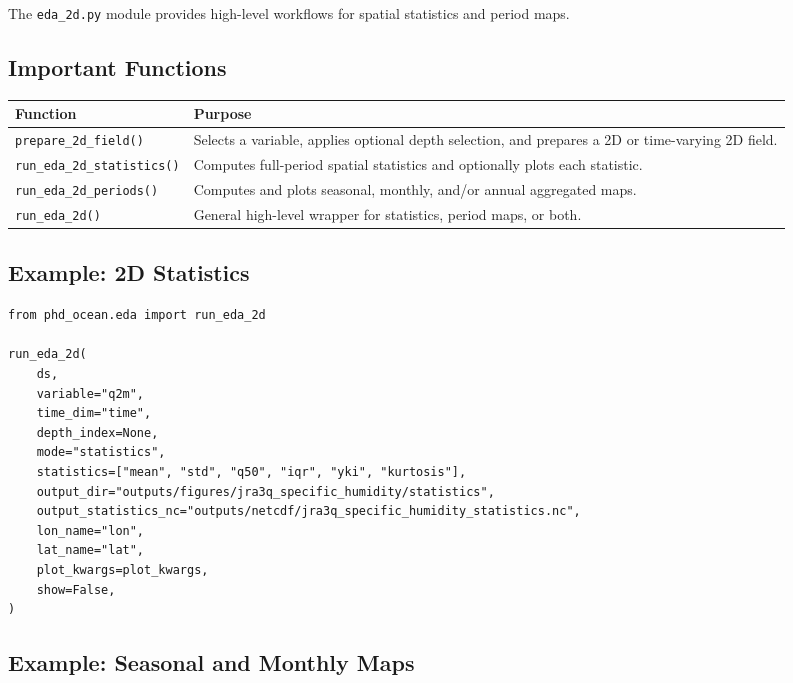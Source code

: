 \documentclass[11pt,a4paper]{article}
\begin{document}
The \texttt{eda\_2d.py} module provides high-level workflows for spatial statistics and
period maps.

\subsection{Important Functions}

\begin{longtable}{p{}p{}}
\toprule
\textbf{Function} & \textbf{Purpose} \\
\midrule
\endhead

\texttt{prepare\_2d\_field()} &
Selects a variable, applies optional depth selection, and prepares a 2D or time-varying 2D field. \\

\texttt{run\_eda\_2d\_statistics()} &
Computes full-period spatial statistics and optionally plots each statistic. \\

\texttt{run\_eda\_2d\_periods()} &
Computes and plots seasonal, monthly, and/or annual aggregated maps. \\

\texttt{run\_eda\_2d()} &
General high-level wrapper for statistics, period maps, or both. \\

\bottomrule
\end{longtable}

\subsection{Example: 2D Statistics}

\begin{lstlisting}[style=pythonstyle]
from phd_ocean.eda import run_eda_2d

run_eda_2d(
    ds,
    variable="q2m",
    time_dim="time",
    depth_index=None,
    mode="statistics",
    statistics=["mean", "std", "q50", "iqr", "yki", "kurtosis"],
    output_dir="outputs/figures/jra3q_specific_humidity/statistics",
    output_statistics_nc="outputs/netcdf/jra3q_specific_humidity_statistics.nc",
    lon_name="lon",
    lat_name="lat",
    plot_kwargs=plot_kwargs,
    show=False,
)
\end{lstlisting}

\subsection{Example: Seasonal and Monthly Maps}
\end{document}
